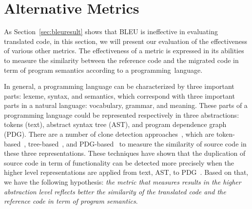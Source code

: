 \section{Alternative Metrics}
\label{sec:alternatives}
%

As Section~\ref{sec:bleuresult} shows that BLEU is ineffective in
evaluating translated code, in this section, we will present our
evaluation of the effectiveness of various other metrics. The
effectiveness of a metric is expressed in its abilities to measure the
similarity between the reference code and the migrated code in term of
program semantics according to a programming~language.


In general, a programming language can be characterized by three
important parts: lexeme, syntax, and semantics, which correspond
with three important parts in a natural language: vocabulary, grammar,
and meaning.
These parts of a programming language could be represented respectively in three 
abstractions: tokens (text), abstract syntax tree (AST), and program 
dependence graph (PDG).
%
There are a number of clone detection approaches~\cite{clone-tse07},
which are token-based~\cite{ccfinder},
tree-based~\cite{baxter98,deckard}, and PDG-based~\cite{deckard2} to
measure the similarity of source code in these three representations.
These techniques have shown that the duplication of source code in
term of functionality can be detected more precisely when the higher
level representations are applied from text, AST, to
PDG~\cite{clone-tse07,deckard2}.
Based on that, we have the following hypothesis: \textit{the metric
  that measures results in the higher abstraction level reflects
  better the similarity of the translated code and the reference code
  in term of program semantics}.


